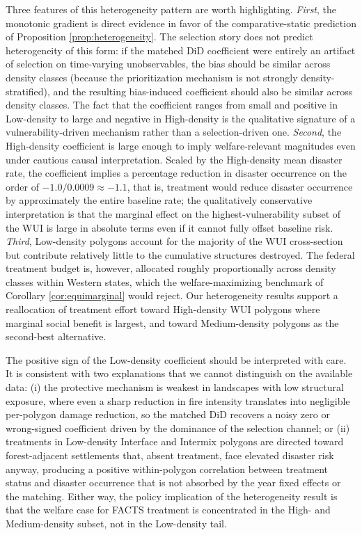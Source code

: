 \documentclass[12pt, letterpaper]{article}
\begin{document}
Three features of this heterogeneity pattern are worth highlighting. \textit{First}, the monotonic gradient is direct evidence in favor of the comparative-static prediction of Proposition \ref{prop:heterogeneity}. The selection story does not predict heterogeneity of this form: if the matched DiD coefficient were entirely an artifact of selection on time-varying unobservables, the bias should be similar across density classes (because the prioritization mechanism is not strongly density-stratified), and the resulting bias-induced coefficient should also be similar across density classes. The fact that the coefficient ranges from small and positive in Low-density to large and negative in High-density is the qualitative signature of a vulnerability-driven mechanism rather than a selection-driven one. \textit{Second}, the High-density coefficient is large enough to imply welfare-relevant magnitudes even under cautious causal interpretation. Scaled by the High-density mean disaster rate, the coefficient implies a percentage reduction in disaster occurrence on the order of $-1.0 / 0.0009 \approx -1.1$, that is, treatment would reduce disaster occurrence by approximately the entire baseline rate; the qualitatively conservative interpretation is that the marginal effect on the highest-vulnerability subset of the WUI is large in absolute terms even if it cannot fully offset baseline risk. \textit{Third}, Low-density polygons account for the majority of the WUI cross-section but contribute relatively little to the cumulative structures destroyed. The federal treatment budget is, however, allocated roughly proportionally across density classes within Western states, which the welfare-maximizing benchmark of Corollary \ref{cor:equimarginal} would reject. Our heterogeneity results support a reallocation of treatment effort toward High-density WUI polygons where marginal social benefit is largest, and toward Medium-density polygons as the second-best alternative.

The positive sign of the Low-density coefficient should be interpreted with care. It is consistent with two explanations that we cannot distinguish on the available data: (i) the protective mechanism is weakest in landscapes with low structural exposure, where even a sharp reduction in fire intensity translates into negligible per-polygon damage reduction, so the matched DiD recovers a noisy zero or wrong-signed coefficient driven by the dominance of the selection channel; or (ii) treatments in Low-density Interface and Intermix polygons are directed toward forest-adjacent settlements that, absent treatment, face elevated disaster risk anyway, producing a positive within-polygon correlation between treatment status and disaster occurrence that is not absorbed by the year fixed effects or the matching. Either way, the policy implication of the heterogeneity result is that the welfare case for FACTS treatment is concentrated in the High- and Medium-density subset, not in the Low-density tail.
\end{document}
